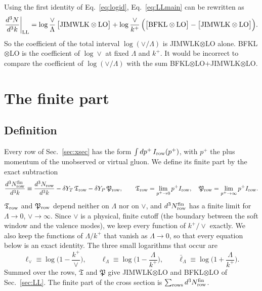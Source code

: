 \documentclass[aps,prd,onecolumn,superscriptaddress,nofootinbib,floatfix,longbibliography,11pt]{revtex4-2}
\numberwithin{equation}{section}
\newcommand{\lV}{\ell_{\vee}}
\newcommand{\lL}{\ell_{\Lambda}}
\newcommand{\lLb}{\bar\ell_{\Lambda}}
\begin{document}
Using the first identity of Eq.~\eqref{eq:logid}, Eq.~\eqref{eq:LLmain} can be rewritten as
\begin{equation}
\frac{d^3N}{d^3k}\bigg|_{\rm LL}=\log\frac{\vee}{\Lambda}\,\big[{\rm JIMWLK}\otimes{\rm LO}\big]+\log\frac{\vee}{k^+}\,\Big(\big[{\rm BFKL}\otimes{\rm LO}\big]-\big[{\rm JIMWLK}\otimes{\rm LO}\big]\Big).
\end{equation}
So the coefficient of the total interval $\log(\vee/\Lambda)$ is JIMWLK$\otimes$LO alone. BFKL$\otimes$LO is the coefficient of $\log\vee$ at fixed $\Lambda$ and $k^+$. It would be incorrect to compare the coefficient of $\log(\vee/\Lambda)$ with the sum BFKL$\otimes$LO$+$JIMWLK$\otimes$LO.
\section{The finite part}\label{sec:finite}

\subsection{Definition}\label{sec:findef}

Every row of Sec.~\ref{sec:xsec} has the form $\int dp^+\,I_{\rm row}(p^+)$, with $p^+$ the plus momentum of the unobserved or virtual gluon. We define its finite part by the exact subtraction
\begin{equation}
\frac{d^3N^{\rm fin}_{\rm row}}{d^3k}\equiv\frac{d^3N_{\rm row}}{d^3k}-\delta Y_T\,\mathfrak T_{\rm row}-\delta Y_P\,\mathfrak P_{\rm row},\qquad \mathfrak T_{\rm row}=\lim_{p^+\to0}p^+I_{\rm row},\quad \mathfrak P_{\rm row}=\lim_{p^+\to\infty}p^+I_{\rm row}.
\label{eq:findef}
\end{equation}
$\mathfrak T_{\rm row}$ and $\mathfrak P_{\rm row}$ depend neither on $\Lambda$ nor on $\vee$, and $d^3N^{\rm fin}_{\rm row}$ has a finite limit for $\Lambda\to0$, $\vee\to\infty$. Since $\vee$ is a physical, finite cutoff (the boundary between the soft window and the valence modes), we keep every function of $k^+/\vee$ exactly. We also keep the functions of $\Lambda/k^+$ that vanish as $\Lambda\to0$, so that every equation below is an exact identity. The three small logarithms that occur are
\begin{equation}
\lV\equiv\log\Big(1-\frac{k^+}{\vee}\Big),\qquad \lL\equiv\log\Big(1-\frac{\Lambda}{k^+}\Big),\qquad \lLb\equiv\log\Big(1+\frac{\Lambda}{k^+}\Big).
\label{eq:smalllogs}
\end{equation}
Summed over the rows, $\mathfrak T$ and $\mathfrak P$ give JIMWLK$\otimes$LO and BFKL$\otimes$LO of Sec.~\ref{sec:LL}. The finite part of the cross section is $\sum_{\rm rows}d^3N^{\rm fin}_{\rm row}$.
\end{document}
